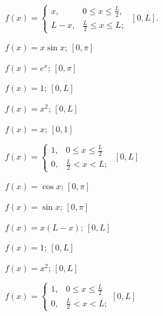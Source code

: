 \begin{exerciselist}
\item\label{exer:11.3.15}\Cex
$f(x)=
\begin{cases}
x,&0\le x\le\frac{L}{2},\\L-x,&\frac{L}{2}\le x\le L;
\end{cases}$
\quad $[0,L]$.




\item\label{exer:11.3.16}\Cex
$f(x)=x\sin x$;   \quad $[0,\pi]$


\item\label{exer:11.3.17}$f(x)=e^x$;   \quad $[0,\pi]$




\item\label{exer:11.3.18}\Cex
$f(x)=1$;  \quad$[0,L]$

\item\label{exer:11.3.19}$f(x)=x^2$;  \quad $[0,L]$


\item\label{exer:11.3.20}\Cex $f(x)=x$;   \quad $[0,1]$


\item\label{exer:11.3.21}\Cex
$f(x)=
\begin{cases}
1,&0\le x\le\frac{L}{2}\\0,&\frac{L}{2}<x<L;
\end{cases}$ \quad $[0,L]$


\item\label{exer:11.3.22}$f(x)=\cos x$;   \quad $[0,\pi]$


\item\label{exer:11.3.23}$f(x)=\sin x$;   \quad $[0,\pi]$


\item\label{exer:11.3.24}\Cex
$f(x)=x(L-x)$;  \quad $[0,L]$



\item\label{exer:11.3.25}\Cex
$f(x)=1$;  \quad$[0,L]$

\item\label{exer:11.3.26}$f(x)=x^2$;  \quad $[0,L]$



\item\label{exer:11.3.27}\Cex
$f(x)=
\begin{cases}
1,&0\le x\le\frac{L}{2}\\0,&\frac{L}{2}<x<L;
\end{cases}$\quad  $[0,L]$


\end{exerciselist}
